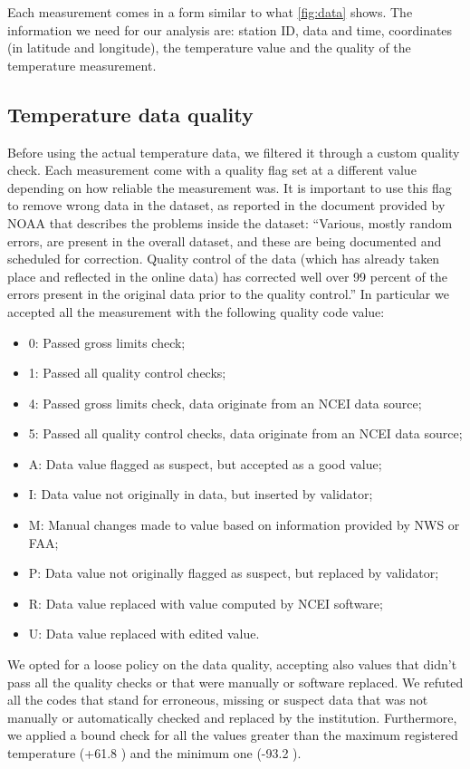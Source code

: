 \documentclass{vldb}
\begin{document}
Each measurement comes in a form similar to what \ref{fig:data} shows. The information we need for our analysis are: station ID, data and time, coordinates (in latitude and longitude), the temperature value and the quality of the temperature measurement.


\subsection{Temperature data quality}
\label{sec:filter}
Before using the actual temperature data, we filtered it through a custom quality check. Each measurement come with a quality flag set at a different value depending on how reliable the measurement was\cite{noaaDataFormat}.
It is important to use this flag to remove wrong data in the dataset, as reported in the document provided by NOAA that describes the problems inside the dataset\cite{noaaProblems}: ``Various, mostly random errors, are present in the overall dataset, and these are being documented and scheduled for correction. Quality control of the data
(which has already taken place and reflected in the online data) has corrected
well over 99 percent of the errors present in the original data prior to the quality control.''
In particular we accepted all the measurement with the following quality code value:
\begin{itemize}
    \item 0: Passed gross limits check;
    \item 1: Passed all quality control checks;
    \item 4: Passed gross limits check, data originate from an NCEI data source;
    \item 5: Passed all quality control checks, data originate from an NCEI data source;
    \item A: Data value flagged as suspect, but accepted as a good value;
    \item I: Data value not originally in data, but inserted by validator;
    \item M: Manual changes made to value based on information provided by NWS or FAA;
    \item P: Data value not originally flagged as suspect, but replaced by validator;
    \item R: Data value replaced with value computed by NCEI software;
    \item U: Data value replaced with edited value.
\end{itemize}
We opted for a loose policy on the data quality, accepting also values that didn't pass all the quality checks or that were manually or software replaced. We refuted all the codes that stand for erroneous, missing or suspect data that was not manually or automatically checked and replaced by the institution. Furthermore, we applied a bound check for all the values greater than the maximum registered temperature (+61.8 \celsius) and the minimum one (-93.2 \celsius). \\
\end{document}
